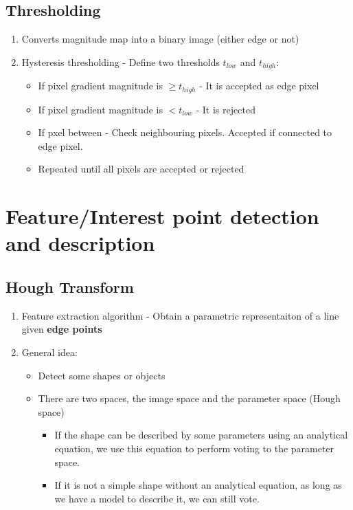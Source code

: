 \documentclass[9pt]{article}
\begin{document}
\begin{multicols*}{2}
        \subsection{Thresholding}
        \begin{enumerate}
            \item Converts magnitude map into a binary image (either edge or not) 
            \item Hysteresis thresholding - Define two thresholds $t_{low}$ and $t_{high}$:
            \begin{itemize}
                \item If pixel gradient magnitude is $\geq t_{high}$ - It is accepted as edge pixel 
                \item If pixel gradient magnitude is $< t_{low}$ - It is rejected 
                \item If pxel between - Check neighbouring pixels. Accepted if connected to edge pixel. 
                \item Repeated until all pixels are accepted or rejected
            \end{itemize}
        \end{enumerate}

    \section{Feature/Interest point detection and description}
        \subsection{Hough Transform}
        \begin{enumerate}
            \item Feature extraction algorithm - Obtain a parametric representaiton of a line given \textbf{edge points}
            
            \item General idea:
            \begin{itemize}
                \item Detect some shapes or objects
                \item There are two spaces, the image space and the parameter space (Hough space)
                \begin{itemize}
                    \item If the shape can be described by some parameters using an analytical equation, we 
                    use this equation to perform voting to the parameter space.
                    \item If it is not a simple shape without an analytical equation, as long as we have a model 
                    to describe it, we can still vote.
                \end{itemize}
            \end{itemize}


\end{enumerate}
\end{multicols*}
\end{document}
